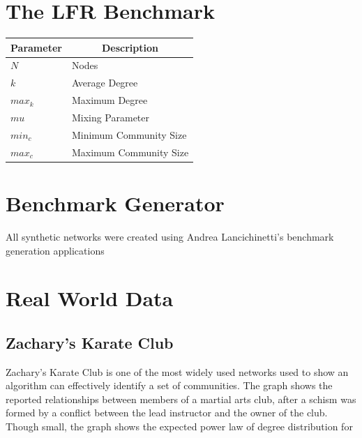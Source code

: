 \section{The LFR Benchmark}

\begin{center}
	\begin{tabular}{ |l | l| } 
		\hline
		\multicolumn{1}{|c|}{\textbf{Parameter}} & \multicolumn{1}{|c|}{\textbf{Description}} \\
		\hline
		\hline
		$N$ & Nodes \\ 
		\hline
		$k$ & Average Degree \\ 
		\hline
		$max_k$ & Maximum Degree \\ 
		\hline	
		$mu$ & Mixing Parameter \\ 
		\hline
		$min_c$ & Minimum Community Size \\
		\hline
		$max_c$ & Maximum Community Size \\ 
		\hline
	\end{tabular}
\end{center}

\cite{Lancichinetti2008}


\section{Benchmark Generator}
All synthetic networks were created using Andrea Lancichinetti's benchmark generation applications 

\section{Real World Data}
\subsection{Zachary's Karate Club}
Zachary's Karate Club \cite{Zachary1977} is one of the most widely used networks used to show an algorithm can effectively identify a set of communities. The graph shows the reported relationships between members of a martial arts club, after a schism was formed by a conflict between the lead instructor and the owner of the club. Though small, the graph shows the expected power law of degree distribution for 

